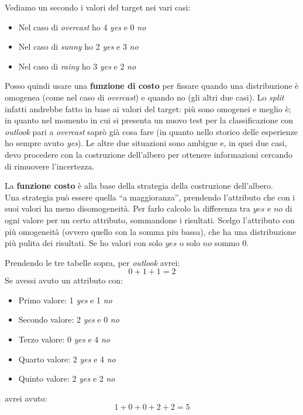 \begin{esempio}
  Vediamo un secondo i valori del target nei vari casi:
  \begin{itemize}
    \item Nel caso di \textit{overcast} ho 4 \textit{yes} e 0 \textit{no}
    \item Nel caso di \textit{sunny} ho 2 \textit{yes} e 3 \textit{no}
    \item Nel caso di \textit{rainy} ho 3 \textit{yes} e 2 \textit{no}
  \end{itemize}
  Posso quindi usare una \textbf{funzione di costo} per fissare quando una
  distribuzione è omogenea (come nel caso di \textit{overcast}) e quando no (gli
  altri due casi). Lo \textit{split} infatti andrebbe fatto in base ai valori
  del target: più sono omogenei e meglio è; in quanto nel momento in cui si
  presenta un nuovo test per la classificazione con \textit{outlook} pari a
  \textit{overcast} saprò già cosa fare (in quanto nello storico delle
  esperienze ho sempre avuto \textit{yes}). Le altre due situazioni sono
  ambigue e, in quei due casi, devo procedere con la costruzione
  dell'albero per ottenere informazioni cercando di rimuovere l'incertezza.  
\end{esempio}
La \textbf{funzione costo} è alla base della strategia della costruzione
dell'albero.\\
Una strategia può essere quella ``a maggioranza'', prendendo l'attributo che con
i suoi valori ha meno disomogeneità. Per farlo calcolo la differenza tra $yes$ e
$no$ di ogni valore per un certo attributo, sommandone i risultati. Scelgo
l'attributo con più omogeneità (ovvero quello con la somma piu bassa), che ha una
distribuzione più pulita dei risultati. Se ho valori con solo
$yes$ o solo $no$ sommo 0.
\begin{esempio}
  Prendendo le tre tabelle sopra, per \textit{outlook} avrei:
  \[0+1+1=2\]
  Se avessi avuto un attributo con:
  \begin{itemize}
    \item Primo valore: 1 \textit{yes} e 1 \textit{no}
    \item Secondo valore: 2 \textit{yes} e 0 \textit{no}
    \item Terzo valore: 0 \textit{yes} e 4 \textit{no}
    \item Quarto valore: 2 \textit{yes} e 4 \textit{no}
    \item Quinto valore: 2 \textit{yes} e 2 \textit{no} 
  \end{itemize}
  avrei avuto:
  \[1+0+0+2+2=5\]
\end{esempio}
